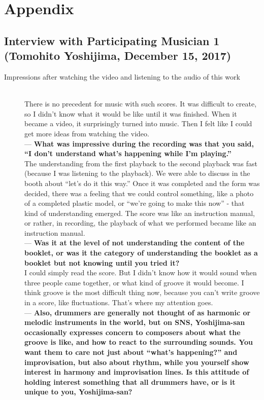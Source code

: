 \section{Appendix \label{appendix}}
\subsection{Interview with Participating Musician 1 (Tomohito Yoshijima, December 15, 2017)}

\begin{description}
 \item[Impressions after watching the video and listening to the audio of this work]\mbox{}\\

 There is no precedent for music with such scores. It was difficult to create, so I didn't know what it would be like until it was finished. When it became a video, it surprisingly turned into music. Then I felt like I could get more ideas from watching the video.\\

 --- {\bf What was impressive during the recording was that you said, ``I don't understand what's happening while I'm playing.''}\\

 The understanding from the first playback to the second playback was fast (because I was listening to the playback). We were able to discuss in the booth about ``let's do it this way.'' Once it was completed and the form was decided, there was a feeling that we could control something, like a photo of a completed plastic model, or ``we're going to make this now'' - that kind of understanding emerged. The score was like an instruction manual, or rather, in recording, the playback of what we performed became like an instruction manual.\\

 --- {\bf Was it at the level of not understanding the content of the booklet, or was it the category of understanding the booklet as a booklet but not knowing until you tried it?}\\

 I could simply read the score. But I didn't know how it would sound when three people came together, or what kind of groove it would become. I think groove is the most difficult thing now, because you can't write groove in a score, like fluctuations. That's where my attention goes.\\

--- {\bf Also, drummers are generally not thought of as harmonic or melodic instruments in the world, but on SNS, Yoshijima-san occasionally expresses concern to composers about what the groove is like, and how to react to the surrounding sounds. You want them to care not just about ``what's happening?'' and improvisation, but also about rhythm, while you yourself show interest in harmony and improvisation lines. Is this attitude of holding interest something that all drummers have, or is it unique to you, Yoshijima-san?}


\end{description}
